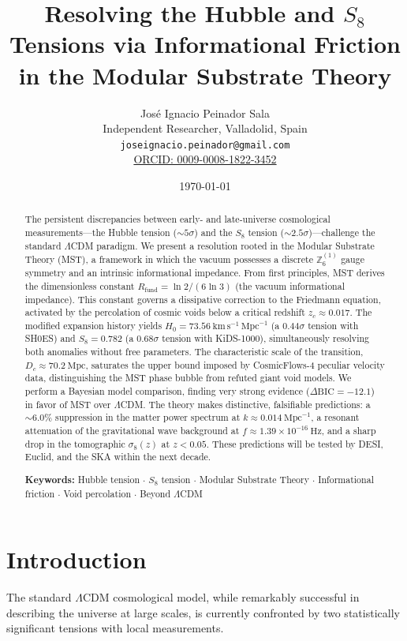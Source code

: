 \documentclass[12pt,a4paper]{article}
\title{\textbf{Resolving the Hubble and \(S_8\) Tensions via Informational Friction\\ in the Modular Substrate Theory}}
\author{José Ignacio Peinador Sala\\
\small Independent Researcher, Valladolid, Spain\\
\small \texttt{joseignacio.peinador@gmail.com}\\
\small \href{https://orcid.org/0009-0008-1822-3452}{ORCID: 0009-0008-1822-3452}}
\date{\today}
\theoremstyle{plain}
\theoremstyle{definition}
\theoremstyle{remark}
\begin{document}
\maketitle

\begin{abstract}
The persistent discrepancies between early- and late-universe cosmological measurements---the Hubble tension (\(\sim5\sigma\)) and the \(S_8\) tension (\(\sim2.5\sigma\))---challenge the standard \(\Lambda\)CDM paradigm. We present a resolution rooted in the Modular Substrate Theory (MST), a framework in which the vacuum possesses a discrete \(\mathbb{Z}_6^{(1)}\) gauge symmetry and an intrinsic informational impedance. From first principles, MST derives the dimensionless constant \(R_{\text{fund}} = \ln 2/(6\ln 3)\) (the vacuum informational impedance). This constant governs a dissipative correction to the Friedmann equation, activated by the percolation of cosmic voids below a critical redshift \(z_c \approx 0.017\). The modified expansion history yields \(H_0 = 73.56\ \text{km}\,\text{s}^{-1}\,\text{Mpc}^{-1}\) (a \(0.44\sigma\) tension with SH0ES) and \(S_8 = 0.782\) (a \(0.68\sigma\) tension with KiDS-1000), simultaneously resolving both anomalies without free parameters. The characteristic scale of the transition, \(D_c \approx 70.2\ \text{Mpc}\), saturates the upper bound imposed by CosmicFlows-4 peculiar velocity data, distinguishing the MST phase bubble from refuted giant void models. We perform a Bayesian model comparison, finding very strong evidence (\(\Delta\text{BIC} = -12.1\)) in favor of MST over \(\Lambda\)CDM. The theory makes distinctive, falsifiable predictions: a \(\sim6.0\%\) suppression in the matter power spectrum at \(k \approx 0.014\ \text{Mpc}^{-1}\), a resonant attenuation of the gravitational wave background at \(f \approx 1.39\times10^{-16}\ \text{Hz}\), and a sharp drop in the tomographic \(\sigma_8(z)\) at \(z < 0.05\). These predictions will be tested by DESI, Euclid, and the SKA within the next decade.

\vspace{1em}
\noindent\textbf{Keywords:} Hubble tension $\cdot$ $S_8$ tension $\cdot$ Modular Substrate Theory $\cdot$ Informational friction $\cdot$ Void percolation $\cdot$ Beyond $\Lambda$CDM
\end{abstract}

\section{Introduction}
The standard \(\Lambda\)CDM cosmological model, while remarkably successful in describing the universe at large scales, is currently confronted by two statistically significant tensions with local measurements.
\end{document}

